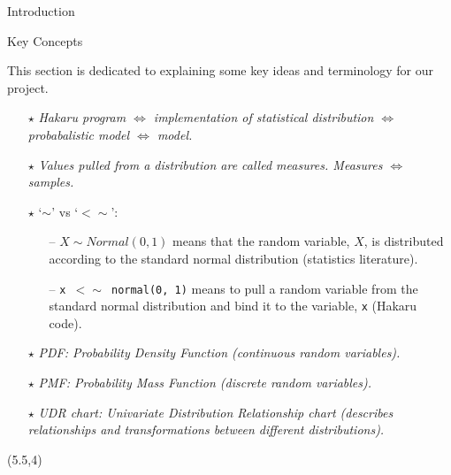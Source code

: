 \documentclass[22pt]{beamer}
\begin{document}
\begin{frame}[fragile]
\begin{textblock}{5}
\begin{block}{Introduction}
\end{block}


\begin{block}{Key Concepts}
\justifying


\tiny{This section is dedicated to explaining some key ideas and terminology for our project.}


\begin{itemize}
	\item[\textbf{$\star$}] \textit{Hakaru program $\Longleftrightarrow$ implementation of statistical distribution $\Longleftrightarrow$ probabalistic model $\Longleftrightarrow$ model.}
	\item[\textbf{$\star$}] \textit{Values pulled from a distribution are called measures. Measures $\Longleftrightarrow$ samples.}
	\item[\textbf{$\star$}] `{\textbf{$\sim$}}' vs `{\textbf{$<\sim$}}':
      \begin{itemize}
          \tiny
          \item[--] \tiny{$X \sim Normal(0, 1)$ means that the random variable, $X$, is distributed according to the standard normal distribution (statistics literature).}
          \item[--] \tiny{{\tt \tiny{x $<\sim$ normal(0, 1)}} means to pull a random variable from the standard normal distribution and bind it to the variable, {\tt \tiny{x}} (Hakaru code).}
      \end{itemize}
	\item[\textbf{$\star$}] \textit{PDF: Probability Density Function (continuous random variables).}
	\item[\textbf{$\star$}] \textit{PMF: Probability Mass Function (discrete random variables).}
	\item[\textbf{$\star$}] \textit{UDR chart: Univariate Distribution Relationship chart (describes relationships and transformations between different distributions).}
\end{itemize}

\end{block}



\begin{textblock}{5}(5.5,4)



\end{textblock}
\end{textblock}
\end{frame}
\end{document}
